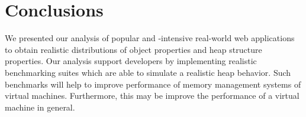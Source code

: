 
\section{Conclusions}

We presented our analysis of popular and \JS-intensive real-world web
applications to obtain realistic distributions of object properties and heap
structure properties. Our analysis support developers by implementing realistic
\JS benchmarking suites which are able to simulate a realistic \JS heap
behavior. Such benchmarks will help to improve performance of memory management
systems of \JS virtual machines. Furthermore, this may be improve the
performance of a \JS virtual machine in general.